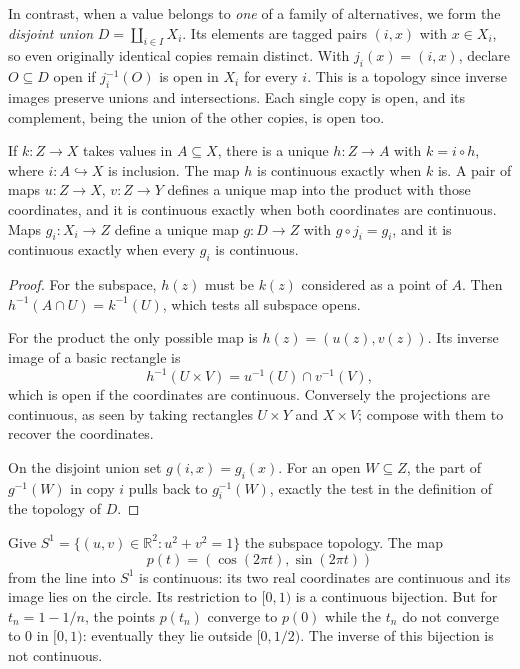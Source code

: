 In contrast, when a value belongs to \emph{one} of a family of alternatives, we form the \emph{disjoint union} $D=\coprod_{i\in I}X_i$. Its elements are tagged pairs $(i,x)$ with $x\in X_i$, so even originally identical copies remain distinct. With $j_i(x)=(i,x)$, declare $O\subseteq D$ open if $j_i^{-1}(O)$ is open in $X_i$ for every $i$. This is a topology since inverse images preserve unions and intersections. Each single copy is open, and its complement, being the union of the other copies, is open too.

\begin{proposition}\label{f:top-universal}
If $k:Z\to X$ takes values in $A\subseteq X$, there is a unique $h:Z\to A$ with $k=i\circ h$, where $i:A\hookrightarrow X$ is inclusion. The map $h$ is continuous exactly when $k$ is. A pair of maps $u:Z\to X$, $v:Z\to Y$ defines a unique map into the product with those coordinates, and it is continuous exactly when both coordinates are continuous. Maps $g_i:X_i\to Z$ define a unique map $g:D\to Z$ with $g\circ j_i=g_i$, and it is continuous exactly when every $g_i$ is continuous.
\end{proposition}
\begin{proof}
For the subspace, $h(z)$ must be $k(z)$ considered as a point of $A$. Then $h^{-1}(A\cap U)=k^{-1}(U)$, which tests all subspace opens.

For the product the only possible map is $h(z)=(u(z),v(z))$. Its inverse image of a basic rectangle is
\[
 h^{-1}(U\times V)=u^{-1}(U)\cap v^{-1}(V),
\]
which is open if the coordinates are continuous. Conversely the projections are continuous, as seen by taking rectangles $U\times Y$ and $X\times V$; compose with them to recover the coordinates.

On the disjoint union set $g(i,x)=g_i(x)$. For an open $W\subseteq Z$, the part of $g^{-1}(W)$ in copy $i$ pulls back to $g_i^{-1}(W)$, exactly the test in the definition of the topology of $D$.
\end{proof}

\begin{example}\label{f:top-turn}
Give $S^1=\{(u,v)\in\mathbb R^2:u^2+v^2=1\}$ the subspace topology. The map
\[
 p(t)=(\cos(2\pi t),\sin(2\pi t))
\]
from the line into $S^1$ is continuous: its two real coordinates are continuous and its image lies on the circle. Its restriction to $[0,1)$ is a continuous bijection. But for $t_n=1-1/n$, the points $p(t_n)$ converge to $p(0)$ while the $t_n$ do not converge to $0$ in $[0,1)$: eventually they lie outside $[0,1/2)$. The inverse of this bijection is not continuous.
\end{example}

